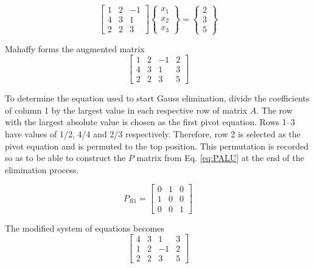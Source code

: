 \documentclass[12pt]{article}   %
\begin{document}
\begin{equation}
\begin{bmatrix}
1 & 2 & -1\\
4 & 3 & 1\\
2 & 2 & 3
\end{bmatrix}
\begin{Bmatrix}
x_1 \\ x_2 \\ x_3
\end{Bmatrix}=
\begin{Bmatrix}
2 \\ 3 \\ 5
\end{Bmatrix}
\end{equation}

Mahaffy forms the augmented matrix
\begin{equation}
\left[
\begin{array}{ccc|c}
1 & 2 & -1 & 2 \\
4 & 3 & 1 & 3 \\
2 & 2 & 3 & 5
\end{array}
\right]
\end{equation}

To determine the equation used to start Gauss elimination, divide the coefficients of column 1 by the largest value in each respective row of matrix $A$. The row with the largest absolute value is chosen as the first pivot equation. Rows 1--3 have values of 1/2, 4/4 and 2/3 respectively. Therefore, row 2 is selected as the pivot equation and is permuted to the top position. This permutation is recorded so as to be able to construct the $P$ matrix from Eq. \ref{eq:PALU} at the end of the elimination process.

\begin{equation}
P_{R1}=\begin{bmatrix}
0 & 1 & 0\\
1 & 0 & 0\\
0 & 0 & 1
\end{bmatrix}
\end{equation}

The modified system of equations becomes
\begin{equation}
\left[
\begin{array}{ccc|c}
4 & 3 & 1 & 3 \\
1 & 2 & -1 & 2 \\
2 & 2 & 3 & 5 
\end{array}
\right]
\end{equation}
\end{document}
